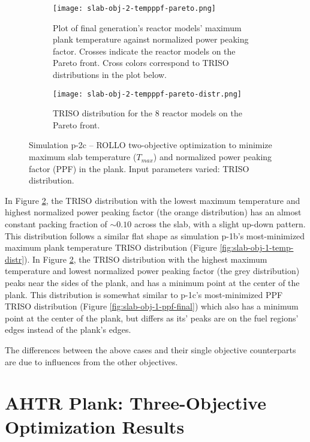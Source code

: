\begin{figure}[htbp!]
    \centering
    \begin{subfigure}{\textwidth}
        \texttt{[image: slab-obj-2-tempppf-pareto.png]}
        \caption{Plot of final generation's reactor models' maximum plank temperature against normalized 
        power peaking factor. Crosses indicate the reactor models on the Pareto front. Cross colors 
        correspond to TRISO distributions in the plot below.}
        \label{fig:slab-obj-2-tempppf-pareto} 
    \end{subfigure}
    \begin{subfigure}{\textwidth}
        \texttt{[image: slab-obj-2-tempppf-pareto-distr.png]}
        \caption{TRISO distribution for the 8 reactor models on the Pareto front.}
        \label{fig:slab-obj-2-tempppf-pareto-distr} 
    \end{subfigure}
    \caption{Simulation p-2c -- ROLLO two-objective optimization to minimize maximum slab temperature 
    ($T_{max}$) and normalized power peaking factor (PPF) in the plank. 
    Input parameters varied: TRISO distribution.}
    \label{fig:slab-obj-2-tempppf}
\end{figure}
In Figure \ref{fig:slab-obj-2-tempppf-pareto-distr}, the TRISO distribution with 
the lowest maximum temperature and highest normalized power peaking factor (the orange 
distribution) has an almost constant packing fraction of $\sim0.10$ across the slab, 
with a slight up-down pattern. 
This distribution follows a similar flat shape as simulation p-1b's most-minimized maximum 
plank temperature TRISO distribution (Figure \ref{fig:slab-obj-1-temp-distr}).
In Figure \ref{fig:slab-obj-2-tempppf-pareto-distr}, the TRISO distribution with 
the highest maximum temperature and lowest normalized power peaking factor (the grey 
distribution) peaks near the sides of the plank, and has a minimum point at the center
of the plank. 
This distribution is somewhat similar to p-1c's most-minimized PPF TRISO distribution 
(Figure \ref{fig:slab-obj-1-ppf-final})
which also has a minimum point at the center of the plank, but differs as its' peaks 
are on the fuel regions' edges instead of the plank's edges. 

The differences between the above cases and their single objective counterparts are due to 
influences from the other objectives. 

\pagebreak
\section{AHTR Plank: Three-Objective Optimization Results}
\label{sec:plank-three-obj}

